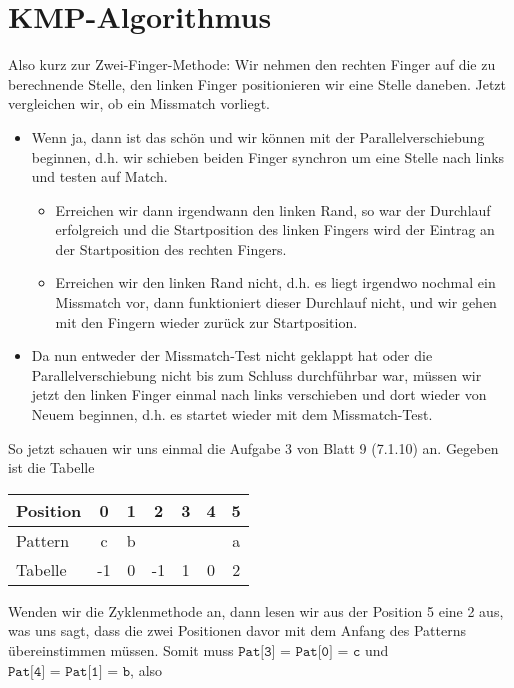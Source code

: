 \documentclass[a4paper, 12pt]{article}
\begin{document}
	\section*{KMP-Algorithmus}
	
	Also kurz zur Zwei-Finger-Methode: Wir nehmen den rechten Finger auf die zu berechnende Stelle, den linken Finger positionieren wir eine Stelle daneben. Jetzt vergleichen wir, ob ein Missmatch vorliegt.
	\begin{itemize}
		\item Wenn ja, dann ist das schön und wir können mit der Parallelverschiebung beginnen, d.h. wir schieben beiden Finger synchron um eine Stelle nach links und testen auf Match. 
		\begin{itemize}
			\item Erreichen wir dann irgendwann den linken Rand, so war der Durchlauf erfolgreich und die Startposition des linken Fingers wird der Eintrag an der Startposition des rechten Fingers.
			\item Erreichen wir den linken Rand nicht, d.h. es liegt irgendwo nochmal ein Missmatch vor, dann funktioniert dieser Durchlauf nicht, und wir gehen mit den Fingern wieder zurück zur Startposition.
		\end{itemize}
		\item Da nun entweder der Missmatch-Test nicht geklappt hat oder die Parallelverschiebung nicht bis zum Schluss durchführbar war, müssen wir jetzt den linken Finger einmal nach links verschieben und dort wieder von Neuem beginnen, d.h. es startet wieder mit dem Missmatch-Test.
	\end{itemize}

	So jetzt schauen wir uns einmal die Aufgabe 3 von Blatt 9 (7.1.10) an.
	Gegeben ist die Tabelle
	
	\begin{center}
		\begin{tabular}{l|cccccc}
			Position & 0 & 1 & 2 & 3 & 4 & 5 \\  \hline
			Pattern & c & b & & & & a \\ \hline
			Tabelle & -1 & 0 & -1 & 1 & 0 & 2
		\end{tabular}
	\end{center}

	Wenden wir die Zyklenmethode an, dann lesen wir aus der Position 5 eine 2 aus, was uns sagt, dass die zwei Positionen davor mit dem Anfang des Patterns übereinstimmen müssen. Somit muss $\texttt{Pat[3] = Pat[0] = c}$ und $\texttt{Pat[4] = Pat[1] = b}$, also 
	
\end{document}
